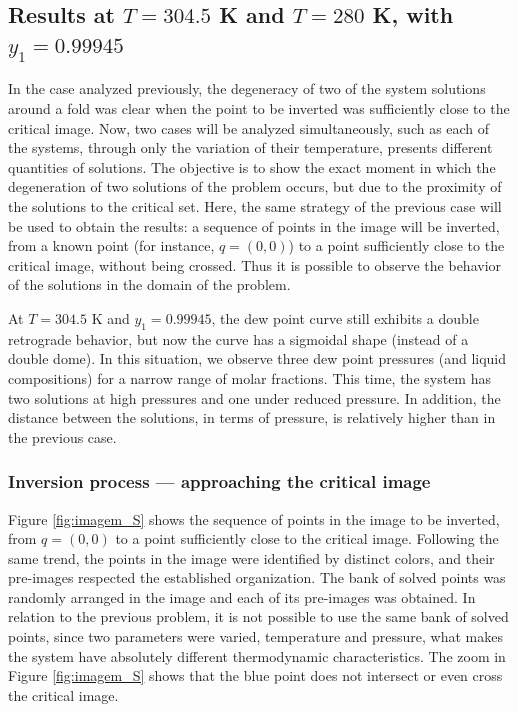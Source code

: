 \documentclass[journal=iecred,manuscript=article]{achemso}
\theoremstyle{definition}
\theoremstyle{remark}
\begin{document}
\subsection{Results at $ T = 304.5 $ K and $ T = 280 $ K, with $ y_1 = 0.99945 $}

In the case analyzed previously, the degeneracy of two of the system solutions around a fold was clear when the point to be inverted was sufficiently close to the critical image. Now, two cases will be analyzed simultaneously, such as each of the systems, through only the variation of their temperature, presents different quantities of solutions. The objective is to show the exact moment in which the degeneration of two solutions of the problem occurs, but due to the proximity of the solutions to the critical set. Here, the same strategy of the previous case will be used to obtain the results: a sequence of points in the image will be inverted, from a known point (for instance, $ q = \left(0, 0\right) $) to a point sufficiently close to the critical image, without being crossed. Thus it is possible to observe the behavior of the solutions in the domain of the problem.

At $T = 304.5$ K and $y_1 = 0.99945$, the dew point curve still exhibits a double retrograde behavior, but now the curve has a sigmoidal shape (instead of a double dome). In this situation, we observe three dew point pressures (and liquid compositions) for a narrow range of molar fractions. This time, the system has two solutions at high pressures and one under reduced pressure. In addition, the distance between the solutions, in terms of pressure, is relatively higher than in the previous case.

\subsubsection{Inversion process --- approaching  the critical image}

Figure \ref{fig:imagem_S} shows the sequence of points in the image to be inverted, from $ q = \left(0, 0\right) $ to a point sufficiently close to the critical image. Following the same trend, the points in the image were identified by distinct colors, and their pre-images respected the established organization. The bank of solved points was randomly arranged in the image and each of its pre-images was obtained. In relation to the previous problem, it is not possible to use the same bank of solved points, since two parameters were varied, temperature and pressure, what makes the system have absolutely different thermodynamic characteristics. The zoom in Figure \ref{fig:imagem_S} shows that the blue point does not intersect or even cross the critical image.
\end{document}

